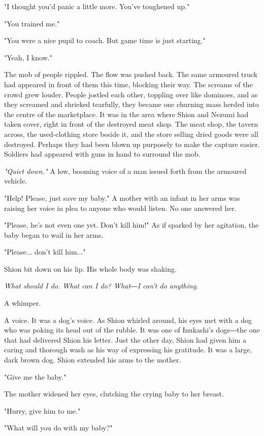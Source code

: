 "I thought you'd panic a little more. You've toughened up."

"You trained me."

"You were a nice pupil to coach. But game time is just starting."

"Yeah, I know."

The mob of people rippled. The flow was pushed back. The same armoured
truck had appeared in front of them this time, blocking their way. The
screams of the crowd grew louder. People jostled each other, toppling
over like dominoes, and as they screamed and shrieked tearfully, they
became one churning mass herded into the centre of the marketplace. It
was in the area where Shion and Nezumi had taken cover, right in front
of the destroyed meat shop. The meat shop, the tavern across, the
used-clothing store beside it, and the store selling dried goods were
all destroyed. Perhaps they had been blown up purposely to make the
capture easier. Soldiers had appeared with guns in hand to surround the
mob.

\emph{"Quiet down."} A low, booming voice of a man issued forth from the
armoured vehicle.

"Help! Please, just save my baby." A mother with an infant in her arms
was raising her voice in plea to anyone who would listen. No one
answered her.

"Please, he's not even one yet. Don't kill him!" As if sparked by her
agitation, the baby began to wail in her arms.

"Please... don't kill him..."

Shion bit down on his lip. His whole body was shaking.

\emph{What should I do. What can I do? What―I can't do anything.}

A whimper.

A voice. It was a dog's voice. As Shion whirled around, his eyes met
with a dog who was poking its head out of the rubble. It was one of
Inukashi's dogs―the one that had delivered Shion his letter. Just the
other day, Shion had given him a caring and thorough wash as his way of
expressing his gratitude. It was a large, dark brown dog. Shion extended
his arms to the mother.

"Give me the baby."

The mother widened her eyes, clutching the crying baby to her breast.

"Hurry, give him to me."

"What will you do with my baby?"

